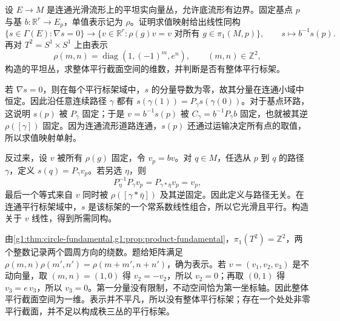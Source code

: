 \begin{exercise}\label{g1:ex:flat-parallel-section-invariants}
	设 \(E\to M\) 是连通光滑流形上的平坦实向量丛，允许底流形有边界。固定基点 \(p\) 与基 \(b:\mathbb R^r\to E_p\)，单值表示记为 \(\rho\)。证明求值映射给出线性同构
	\[
		\{s\in\Gamma(E):\nabla s=0\}
		\longrightarrow
		\{v\in\mathbb R^r:\rho(g)v=v\text{ 对所有 }g\in\pi_1(M,p)\},
		\qquad s\longmapsto b^{-1}s(p).
	\]
	再对 \(T^2=S^1\times S^1\) 上由表示
	\[
		\rho(m,n)=\operatorname{diag}(1,(-1)^m,e^n),\qquad(m,n)\in\mathbb Z^2,
	\]
	构造的平坦丛，求整体平行截面空间的维数，并判断是否有整体平行标架。
\end{exercise}
\begin{solution}
	若 \(\nabla s=0\)，则在每个平行标架域中，\(s\) 的分量导数为零，故其分量在连通小域中恒定。因此沿任意连续路径 \(\gamma\) 都有 \(s(\gamma(1))=P_\gamma s(\gamma(0))\)。对于基点环路，这说明 \(s(p)\) 被 \(P_\gamma\) 固定；于是 \(v=b^{-1}s(p)\) 被 \(C_\gamma=b^{-1}P_\gamma b\) 固定，也就被其逆 \(\rho([\gamma])\) 固定。因为连通流形道路连通，\(s(p)\) 还通过运输决定所有点的取值，所以求值映射单射。

	反过来，设 \(v\) 被所有 \(\rho(g)\) 固定，令 \(v_p=bv\)。对 \(q\in M\)，任选从 \(p\) 到 \(q\) 的路径 \(\gamma\)，定义 \(s(q)=P_\gamma v_p\)。若另选 \(\eta\)，则
	\[
		P_\eta^{-1}P_\gamma v_p=P_{\gamma*\bar\eta}v_p=v_p,
	\]
	最后一个等式来自 \(v\) 同时被 \(\rho([\gamma*\bar\eta])\) 及其逆固定。因此定义与路径无关。在连通平行标架域中，\(s\) 是该标架的一个常系数线性组合，所以它光滑且平行。构造关于 \(v\) 线性，得到所需同构。

	由\cref{g1:thm:circle-fundamental,g1:prop:product-fundamental}，\(\pi_1(T^2)=\mathbb Z^2\)，两个整数记录两个圆周方向的绕数。题给矩阵满足 \(\rho(m,n)\rho(m',n')=\rho(m+m',n+n')\)，确为表示。若 \(v=(v_1,v_2,v_3)\) 是不动向量，取 \((m,n)=(1,0)\) 得 \(v_2=-v_2\)，所以 \(v_2=0\)；再取 \((0,1)\) 得 \(v_3=e\,v_3\)，所以 \(v_3=0\)。第一分量没有限制，不动空间恰为第一坐标轴。因此整体平行截面空间为一维。表示并不平凡，所以没有整体平行标架；存在一个处处非零平行截面，并不足以构成秩三丛的平行标架。
\end{solution}

